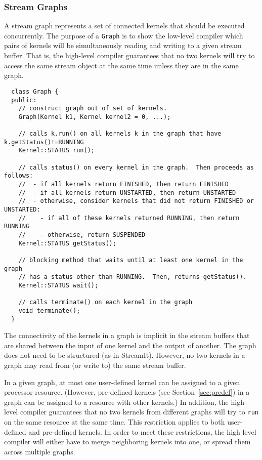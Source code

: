 \subsubsection{Stream Graphs}
\label{sec:streamgraph}

A stream graph represents a set of connected kernels that should be
executed concurrently.  The purpose of a {\tt Graph} is to show the
low-level compiler which pairs of kernels will be simultaneously
reading and writing to a given stream buffer.  That is, the high-level
compiler guarantees that no two kernels will try to access the same
stream object at the same time unless they are in the same graph.
{\small
\begin{verbatim}
  class Graph {
  public:
    // construct graph out of set of kernels.
    Graph(Kernel k1, Kernel kernel2 = 0, ...);

    // calls k.run() on all kernels k in the graph that have k.getStatus()!=RUNNING
    Kernel::STATUS run();

    // calls status() on every kernel in the graph.  Then proceeds as follows:
    //  - if all kernels return FINISHED, then return FINISHED
    //  - if all kernels return UNSTARTED, then return UNSTARTED
    //  - otherwise, consider kernels that did not return FINISHED or UNSTARTED:
    //    - if all of these kernels returned RUNNING, then return RUNNING
    //    - otherwise, return SUSPENDED
    Kernel::STATUS getStatus();

    // blocking method that waits until at least one kernel in the graph 
    // has a status other than RUNNING.  Then, returns getStatus().
    Kernel::STATUS wait();

    // calls terminate() on each kernel in the graph
    void terminate();
  }
\end{verbatim}}
\noindent The connectivity of the kernels in a graph is implicit in
the stream buffers that are shared between the input of one kernel and
the output of another.  The graph does not need to be structured (as
in StreamIt).  However, no two kernels in a graph may read from (or
write to) the same stream buffer.

In a given graph, at most one user-defined kernel can be assigned to a
given processor resource.  (However, pre-defined kernels (see
Section~\ref{sec:predef}) in a graph can be assigned to a resource
with other kernels.)  In addition, the high-level compiler guarantees
that no two kernels from different graphs will try to {\tt run} on the
same resource at the same time.  This restriction applies to both
user-defined and pre-defined kernels.  In order to meet these
restrictions, the high level compiler will either have to merge
neighboring kernels into one, or spread them across multiple graphs.

